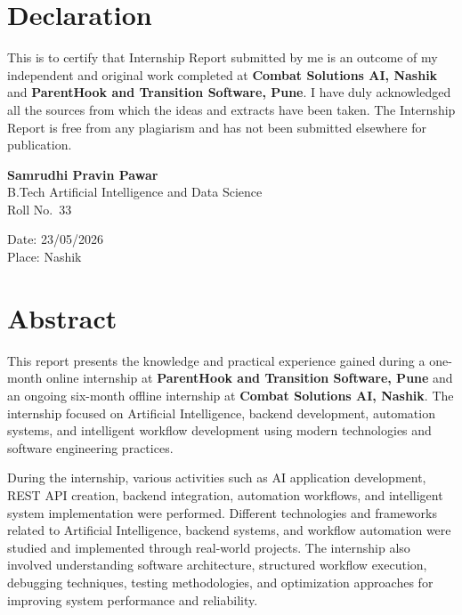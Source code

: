 \documentclass[12pt,a4paper]{report}
\begin{document}
\newpage
\chapter*{Declaration}

This is to certify that Internship Report submitted by me is an outcome of my independent and original work completed at \textbf{Combat Solutions AI, Nashik} and \textbf{ParentHook and Transition Software, Pune}. I have duly acknowledged all the sources from which the ideas and extracts have been taken. The Internship Report is free from any plagiarism and has not been submitted elsewhere for publication.

\vspace{2cm}
\begin{flushright}
\textbf{Samrudhi Pravin Pawar}\\
B.Tech Artificial Intelligence and Data Science\\
Roll No.\ 33
\end{flushright}

\vspace{1cm}
\noindent Date: 23/05/2026\\
Place: Nashik

\newpage
\chapter*{Abstract}

This report presents the knowledge and practical experience gained during a one-month online internship at \textbf{ParentHook and Transition Software, Pune} and an ongoing six-month offline internship at \textbf{Combat Solutions AI, Nashik}. The internship focused on Artificial Intelligence, backend development, automation systems, and intelligent workflow development using modern technologies and software engineering practices.

During the internship, various activities such as AI application development, REST API creation, backend integration, automation workflows, and intelligent system implementation were performed. Different technologies and frameworks related to Artificial Intelligence, backend systems, and workflow automation were studied and implemented through real-world projects. The internship also involved understanding software architecture, structured workflow execution, debugging techniques, testing methodologies, and optimization approaches for improving system performance and reliability.
\end{document}
